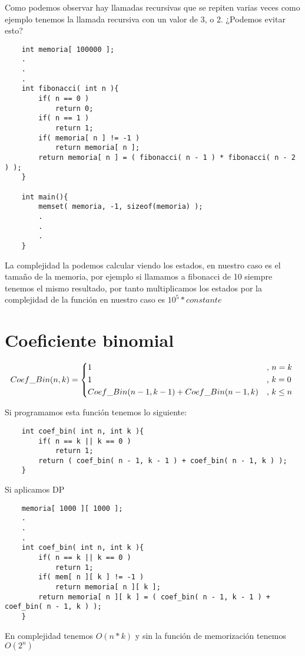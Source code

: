 Como podemos observar hay llamadas recursivas que se repiten varias veces como ejemplo tenemos la llamada recursiva con un valor de 3, o 2. ¿Podemos evitar esto?

\begin{lstlisting}
    int memoria[ 100000 ];
    .
    .
    .
    int fibonacci( int n ){
        if( n == 0 )
            return 0;
        if( n == 1 )
            return 1;
        if( memoria[ n ] != -1 )
            return memoria[ n ];
        return memoria[ n ] = ( fibonacci( n - 1 ) * fibonacci( n - 2 ) );
    }

    int main(){
        memset( memoria, -1, sizeof(memoria) );
        .
        .
        .
    }
\end{lstlisting}

La complejidad la podemos calcular viendo los estados, en nuestro caso es el tamaño de la memoria, por ejemplo si llamamos a fibonacci de 10 siempre tenemos el mismo resultado, por tanto multiplicamos los estados por la complejidad de la función en nuestro caso es $10^{5} * constante$

\section{Coeficiente binomial}
\[
    Coef\_Bin(n, k) = 
    \begin{cases*}
        1 & , $n = k$ \\    
        1 & , $k = 0$ \\
        Coef\_Bin( n - 1, k - 1 ) + Coef\_Bin( n - 1, k ) & , $ k \leq n$ 
    \end{cases*}    
\]

Si programamos esta función tenemos lo siguiente: 

\begin{lstlisting}
    int coef_bin( int n, int k ){
        if( n == k || k == 0 )
            return 1;
        return ( coef_bin( n - 1, k - 1 ) + coef_bin( n - 1, k ) ); 
    }
\end{lstlisting}

Si aplicamos DP
\begin{lstlisting}
    memoria[ 1000 ][ 1000 ];
    .
    .
    .
    int coef_bin( int n, int k ){
        if( n == k || k == 0 )
            return 1;
        if( mem[ n ][ k ] != -1 )
            return memoria[ n ][ k ];
        return memoria[ n ][ k ] = ( coef_bin( n - 1, k - 1 ) + coef_bin( n - 1, k ) ); 
    }
\end{lstlisting}
En complejidad tenemos $O(n * k)$ y sin la función de memorización tenemos $O(2^{n})$

